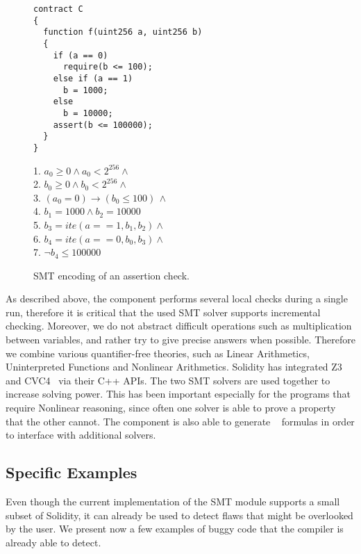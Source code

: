 \begin{figure}
\label{figure:solidity_encoding_1}
\noindent\begin{minipage}{.48\textwidth}
\begin{verbatim}
contract C
{
  function f(uint256 a, uint256 b)
  {
    if (a == 0)
      require(b <= 100);
    else if (a == 1)
      b = 1000;
    else
      b = 10000;
    assert(b <= 100000);
  }
}
\end{verbatim}
\end{minipage}\hfill
\begin{minipage}{.48\textwidth}
1. $a_0 \ge 0 \land a_0 < 2^{256}  \land \phantom{x}$\\
2. $b_0 \ge 0 \land b_0 < 2^{256}  \land \phantom{x}$\\
3. $(a_0 = 0) \rightarrow (b_0 \le 100) \, \land$\\
4. $b_1 = 1000 \land b_2 = 10000$\\
5. $b_3 = ite(a == 1, b_1, b_2) \land \phantom{x}$\\
6. $b_4 = ite(a == 0, b_0, b_3) \land \phantom{x}$\\
7. $\neg b_4 \le 100000$
\end{minipage}
\caption{SMT encoding of an assertion check.}
\end{figure}

As described above, the component performs several local checks during a single
run, therefore it is critical that the used SMT solver supports
incremental checking.
%
Moreover, we do not abstract difficult operations such as multiplication
between variables, and rather try to give precise answers when possible.
%
Therefore we combine various quantifier-free theories, such as Linear
Arithmetics, Uninterpreted Functions and Nonlinear Arithmetics. 
%
Solidity has integrated Z3~\cite{Z3} and CVC4~\cite{CVC4} via their C++ APIs.
%
The two SMT solvers are used together to increase solving power.
%
This has been important especially for the programs that require Nonlinear
reasoning, since often one solver is able to prove a property that the other
cannot.
%
The component is also able to generate ~\cite{SMTLIB}
formulas in order to interface with additional solvers.

\subsection{Specific Examples}

Even though the current implementation of the SMT module supports a small
subset of Solidity, it can already be used to detect flaws that might be
overlooked by the user.
%
We present now a few examples of buggy code that the compiler is already able
to detect.

